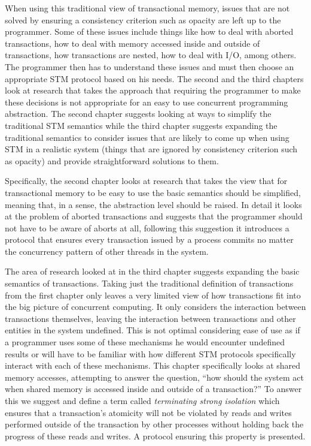 When using this traditional view of transactional memory,
issues that are not solved by ensuring a consistency criterion such as opacity are left up to the programmer.
Some of these issues include things like how to deal with aborted transactions, how to deal
with memory accessed inside and outside of transactions, how transactions are nested,
how to deal with I/O, among others.
The programmer then has to understand these issues and must then choose an
appropriate STM protocol based on his needs.
The second and the third chapters look at research that takes the approach
that requiring the programmer to make these decisions
is not appropriate for an easy to use concurrent programming abstraction.
The second chapter suggests looking at ways to simplify the traditional STM
semantics while the third chapter suggests expanding the traditional semantics to consider
issues that are likely to come up when using STM in a realistic system
(things that are ignored by consistency criterion such as opacity)
and provide straightforward solutions to them.


Specifically, the second chapter looks at research that takes the view that for transactional memory to
be easy to use the basic semantics should be simplified, meaning that,
in a sense, the abstraction level should be raised.
In detail it looks at the problem of aborted transactions and suggests that
the programmer should not have to be aware of aborts at all, following this suggestion it introduces a protocol
that ensures every transaction issued by a process commits no matter the concurrency pattern
of other threads in the system.

The area of research looked at in the third chapter suggests expanding the basic semantics of transactions.
Taking just the traditional definition of transactions from the first chapter only leaves a very limited view of how
transactions fit into the big picture of concurrent computing.
It only considers the interaction between transactions themselves,
leaving the interaction between
transactions and other entities in the system undefined.
This is not optimal considering ease of use as if a programmer uses
some of these mechanisms he would encounter undefined results or will have
to be familiar with how different STM protocols specifically interact with 
each of these mechanisms.
This chapter specifically looks at shared memory accesses, attempting to answer the question, ``how should the system act when shared memory
is accessed inside and outside of a transaction?''
To answer this we suggest and define a term called \emph{terminating strong isolation} which ensures
that a transaction's atomicity will not be violated by reads and writes performed
outside of the transaction by other processes without holding back the progress of
these reads and writes.
A protocol ensuring this property is presented.

